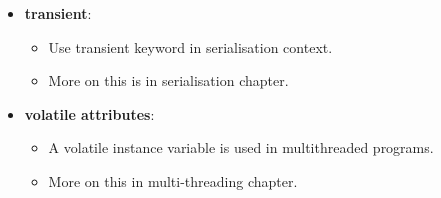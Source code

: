\begin{flushleft}
\begin{itemize}
		\item \textbf{transient}: 
		\begin{itemize}
			\item Use transient keyword in serialisation context.
			\item More on this is in serialisation chapter.
		\end{itemize}
		\bigskip
		\item \textbf{volatile attributes}: 
		\begin{itemize}
			\item A volatile instance variable is used in multithreaded programs.
			\item More on this in multi-threading chapter.		
		\end{itemize}
	\end{itemize}
	
\end{flushleft}

\newpage

